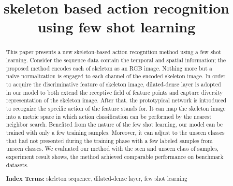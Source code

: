 \documentclass{bmvc2k}
\title{skeleton based action recognition\\ using few shot learning}
\begin{document}
\maketitle

\begin{abstract}
This paper presents a new skeleton-based action recognition method using a few shot learning. Consider the sequence data contain the temporal and spatial information; the proposed method encodes each of skeleton as an RGB image. Nothing more but a naïve normalization is engaged to each channel of the encoded skeleton image. In order to acquire the discriminative feature of skeleton image, dilated-dense layer is adopted in our model to both extend the receptive field of feature points and capture diversity representation of the skeleton image. After that, the prototypical network is introduced to recognize the specific action of the feature stands for. It can map the skeleton image into a metric space in which action classification can be performed by the nearest neighbor search. Benefited from the nature of the few shot learning, our model can be trained with only a few training samples. Moreover, it can adjust to the unseen classes that had not presented during the training phase with a few labeled samples from unseen classes. We evaluated our method with the seen and unseen class of samples, experiment result shows, the method achieved comparable performance on benchmark datasets.

\textbf{Index Terms:} skeleton sequence, dilated-dense layer, few shot learning
\end{abstract}

\end{document}

